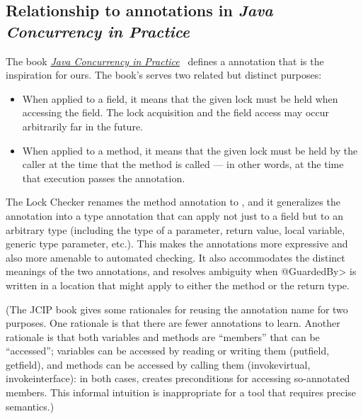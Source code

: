 \subsection{Relationship to annotations in \emph{Java Concurrency in Practice}\label{lock-jcip-annotations}}

The book \href{http://jcip.net/}{\emph{Java Concurrency in Practice}}~\cite{Goetz2006} defines a
\href{http://jcip.net.s3-website-us-east-1.amazonaws.com/annotations/doc/net/jcip/annotations/GuardedBy.html}{} annotation that is the inspiration for ours.  The book's
 serves two related but distinct purposes:

\begin{itemize}
\item
  When applied to a field, it means that the given lock must be held when
  accessing the field.  The lock acquisition and the field access may occur
  arbitrarily far in the future.
\item
  When applied to a method, it means that the given lock must be held by
  the caller at the time that the method is called --- in other words, at
  the time that execution passes the  annotation.
\end{itemize}

The Lock Checker renames the method annotation to
, and it generalizes the
 annotation into a type annotation
that can apply not just to a field but to an arbitrary type (including the
type of a parameter, return value, local variable, generic type parameter,
etc.).  This makes the annotations more expressive and also more amenable
to automated checking.  It also accommodates the distinct
meanings of the two annotations, and resolves ambiguity when \<@GuardedBy>
is written in a location that might apply to either the method or the
return type.

(The JCIP book gives some rationales for reusing the annotation name for
two purposes.  One rationale is
that there are fewer annotations to learn.  Another rationale is
that both variables and methods are ``members'' that can be ``accessed'';
variables can be accessed by reading or writing them (putfield, getfield),
and methods can be accessed by calling them (invokevirtual,
invokeinterface):  in both cases,  creates preconditions
for accessing so-annotated members.  This informal intuition is
inappropriate for a tool that requires precise semantics.)


